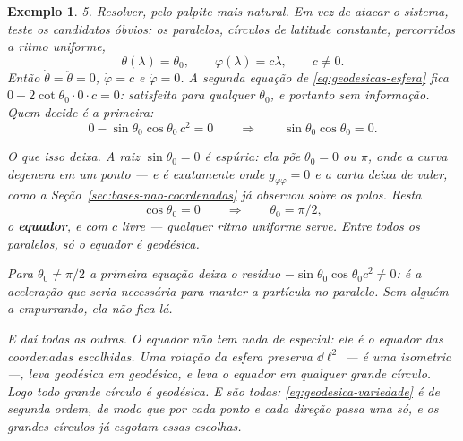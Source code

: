 \documentclass[12pt,a4paper,oneside]{book}
\theoremstyle{rgplain}
\newtheorem{example}{Exemplo}[chapter]
\theoremstyle{rgremark}
\begin{document}
\begin{example}
\emph{5. Resolver, pelo palpite mais natural.} Em vez de atacar o sistema,
teste os candidatos óbvios: os \emph{paralelos}, círculos de latitude
constante, percorridos a ritmo uniforme,
\[
  \theta(\lambda)=\theta_0 ,\qquad \varphi(\lambda)=c\lambda ,\qquad c\ne0 .
\]
Então $\dot\theta=\ddot\theta=0$, $\dot\varphi=c$ e $\ddot\varphi=0$. A
segunda equação de \eqref{eq:geodesicas-esfera} fica
$0+2\cot\theta_0\cdot0\cdot c=0$: satisfeita para \emph{qualquer}
$\theta_0$, e portanto sem informação. Quem decide é a primeira:
\[
  0-\sin\theta_0\cos\theta_0\,c^2=0
  \qquad\Longrightarrow\qquad
  \sin\theta_0\cos\theta_0=0 .
\]

\emph{O que isso deixa.} A raiz $\sin\theta_0=0$ é espúria: ela põe
$\theta_0=0$ ou $\pi$, onde a curva degenera em um ponto --- e é
exatamente onde $g_{\varphi\varphi}=0$ e a carta deixa de valer, como a
Seção~\ref{sec:bases-nao-coordenadas} já observou sobre os polos. Resta
\[
  \cos\theta_0=0
  \qquad\Longrightarrow\qquad
  \theta_0=\pi/2 ,
\]
o \textbf{equador}, e com $c$ livre --- qualquer ritmo uniforme serve.
\emph{Entre todos os paralelos, só o equador é geodésica.}

Para $\theta_0\ne\pi/2$ a primeira equação deixa o resíduo
$-\sin\theta_0\cos\theta_0c^2\ne0$: é a aceleração que seria necessária para
manter a partícula no paralelo. Sem alguém a empurrando, ela não fica lá.

\emph{E daí todas as outras.} O equador não tem nada de especial: ele é o
equador \emph{das coordenadas escolhidas}. Uma rotação da esfera preserva
$\dd\ell^2$ --- é uma isometria ---, leva geodésica em geodésica, e leva o
equador em qualquer grande círculo. Logo todo grande círculo é geodésica. E
são todas: \eqref{eq:geodesica-variedade} é de segunda ordem, de modo que
por cada ponto e cada direção passa uma só, e os grandes círculos já esgotam
essas escolhas.
\end{example}
\end{document}
